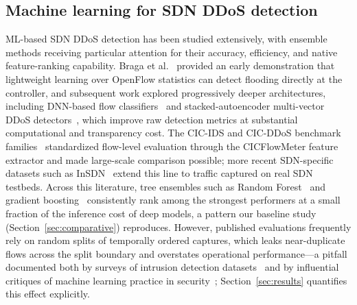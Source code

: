 ﻿\documentclass[journal]{IEEEtran}
\begin{document}
\subsection{Machine learning for SDN DDoS detection}
ML-based SDN DDoS detection has been studied extensively, with ensemble methods receiving particular attention for their accuracy, efficiency, and native feature-ranking capability. Braga et al.~\cite{braga2010lightweight} provided an early demonstration that lightweight learning over OpenFlow statistics can detect flooding directly at the controller, and subsequent work explored progressively deeper architectures, including DNN-based flow classifiers~\cite{tang2016deep} and stacked-autoencoder multi-vector DDoS detectors~\cite{niyaz2017deep}, which improve raw detection metrics at substantial computational and transparency cost. The CIC-IDS and CIC-DDoS benchmark families~\cite{sharafaldin2018cicids,sharafaldin2019ddos} standardized flow-level evaluation through the CICFlowMeter feature extractor and made large-scale comparison possible; more recent SDN-specific datasets such as InSDN~\cite{elsayed2020insdn} extend this line to traffic captured on real SDN testbeds. Across this literature, tree ensembles such as Random Forest~\cite{breiman2001rf} and gradient boosting~\cite{chen2016xgboost} consistently rank among the strongest performers at a small fraction of the inference cost of deep models, a pattern our baseline study (Section~\ref{sec:comparative}) reproduces. However, published evaluations frequently rely on random splits of temporally ordered captures, which leaks near-duplicate flows across the split boundary and overstates operational performance---a pitfall documented both by surveys of intrusion detection datasets~\cite{ring2019survey} and by influential critiques of machine learning practice in security~\cite{sommer2010outside,arp2022dos}; Section~\ref{sec:results} quantifies this effect explicitly.
\end{document}
